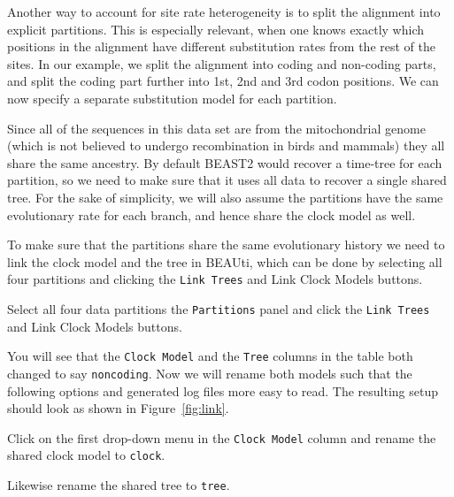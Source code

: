 \documentclass[11pt]{article}
\begin{document}
Another way to account for site rate heterogeneity is to split the alignment into explicit partitions. This is especially relevant, when one knows exactly which positions in the alignment have different substitution rates from the rest of the sites. In our example, we split the alignment into coding and non-coding parts, and split the coding part further into 1st, 2nd and 3rd codon positions. We can now specify a separate substitution model for each partition. 

Since all of the sequences in this data set are from the mitochondrial genome (which is not believed to undergo recombination in birds and mammals) they all share the same ancestry. By default BEAST2 would recover a time-tree for each partition, so we need to make sure that it uses all data to recover a single shared tree. For the sake of simplicity, we will also assume the partitions have the same evolutionary rate for each branch, and hence share the clock model as well.

To make sure that the partitions share the same evolutionary history we need to link the clock model and the tree in BEAUti, which can be done by selecting all four partitions and clicking the \texttt{Link Trees} and {Link Clock Models} buttons.

\begin{framed}
Select all four data partitions the \texttt{Partitions} panel and click the \texttt{Link Trees} and {Link Clock Models} buttons.
\end{framed}

You will see that the \texttt{Clock Model} and the \texttt{Tree} columns in the table both changed to say \texttt{noncoding}. Now we will rename both models such that the following options and generated log files more easy to read. The resulting setup should look as shown in Figure~\ref{fig:link}.

\begin{framed}
Click on the first drop-down menu in the \texttt{Clock Model} column and rename the shared clock model to \texttt{clock}.

Likewise rename the shared tree to \texttt{tree}.
\end{framed}
\end{document}
